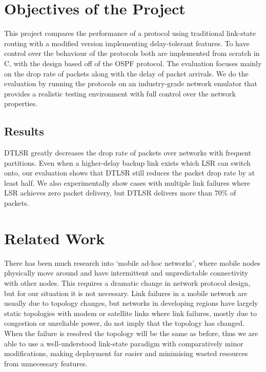 \documentclass[withindex,glossary,openany]{cam-thesis}
\begin{document}
\section{Objectives of the Project}

This project compares the performance of a protocol using traditional link-state routing with a modified version implementing delay-tolerant features. To have control over the behaviour of the protocols both are implemented from scratch in C, with the design based off of the OSPF protocol. The evaluation focuses mainly on the drop rate of packets along with the delay of packet arrivals. We do the evaluation by running the protocols on an industry-grade network emulator that provides a realistic testing environment with full control over the network properties.

\subsection{Results}

DTLSR greatly decreases the drop rate of packets over networks with frequent partitions. Even when a higher-delay backup link exists which LSR can switch onto, our evaluation shows that DTLSR still reduces the packet drop rate by at least half. We also experimentally show cases with multiple link failures where LSR achieves zero packet delivery, but DTLSR delivers more than 70\% of packets.

\section{Related Work}

There has been much research into `mobile ad-hoc networks', where mobile nodes physically move around and have intermittent and unpredictable connectivity with other nodes. This requires a dramatic change in network protocol design, but for our situation it is not necessary. Link failures in a mobile network are usually due to topology changes, but networks in developing regions have largely static topologies with modem or satellite links where link failures, mostly due to congestion or unreliable power, do not imply that the topology has changed. When the failure is resolved the topology will be the same as before, thus we are able to use a well-understood link-state paradigm with comparatively minor modifications, making deployment far easier and minimising wasted resources from unnecessary features.
\end{document}
